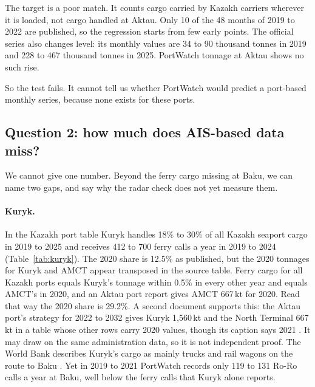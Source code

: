 \documentclass[11pt,a4paper]{article}
\begin{document}
The target is a poor match. It counts cargo carried by Kazakh carriers wherever it is loaded, not cargo handled at Aktau. Only 10 of the 48 months of 2019 to 2022 are published, so the regression starts from few early points. The official series also changes level: its monthly values are 34 to 90 thousand tonnes in 2019 and 228 to 467 thousand tonnes in 2025. PortWatch tonnage at Aktau shows no such rise.

So the test fails. It cannot tell us whether PortWatch would predict a port-based monthly series, because none exists for these ports.

\subsection{Question 2: how much does AIS-based data miss?}
\label{sec:q2}

We cannot give one number. Beyond the ferry cargo missing at Baku, we can name two gaps, and say why the radar check does not yet measure them.

\paragraph{Kuryk.} In the Kazakh port table Kuryk handles 18\% to 30\% of all Kazakh seaport cargo in 2019 to 2025 and receives 412 to 700 ferry calls a year in 2019 to 2024 (Table~\ref{tab:kuryk}). The 2020 share is 12.5\% as published, but the 2020 tonnages for Kuryk and AMCT appear transposed in the source table. Ferry cargo for all Kazakh ports equals Kuryk's tonnage within 0.5\% in every other year and equals AMCT's in 2020, and an Aktau port report gives AMCT 667\,kt for 2020. Read that way the 2020 share is 29.2\%. A second document supports this: the Aktau port's strategy for 2022 to 2032 gives Kuryk 1,560\,kt and the North Terminal 667\,kt in a table whose other rows carry 2020 values, though its caption says 2021 \cite{aktau2022strategy}. It may draw on the same administration data, so it is not independent proof. The World Bank describes Kuryk's cargo as mainly trucks and rail wagons on the route to Baku \cite{worldbank2023middle}. Yet in 2019 to 2021 PortWatch records only 119 to 131 Ro-Ro calls a year at Baku, well below the ferry calls that Kuryk alone reports.
\end{document}
